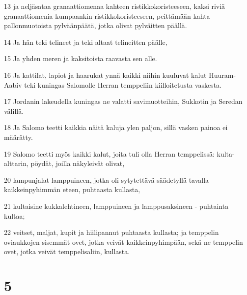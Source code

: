 \par 13 ja neljäsataa granaattiomenaa kahteen ristikkokoristeeseen, kaksi riviä granaattiomenia kumpaankin ristikkokoristeeseen, peittämään kahta pallonmuotoista pylväänpäätä, jotka olivat pylväitten päällä.
\par 14 Ja hän teki telineet ja teki altaat telineitten päälle,
\par 15 Ja yhden meren ja kaksitoista raavasta sen alle.
\par 16 Ja kattilat, lapiot ja haarukat ynnä kaikki niihin kuuluvat kalut Huuram-Aabiv teki kuningas Salomolle Herran temppeliin kiilloitetusta vaskesta.
\par 17 Jordanin lakeudella kuningas ne valatti savimuotteihin, Sukkotin ja Seredan välillä.
\par 18 Ja Salomo teetti kaikkia näitä kaluja ylen paljon, sillä vasken painoa ei määrätty.
\par 19 Salomo teetti myös kaikki kalut, joita tuli olla Herran temppelissä: kulta-alttarin, pöydät, joilla näkyleivät olivat,
\par 20 lampunjalat lamppuineen, jotka oli sytytettävä säädetyllä tavalla kaikkeinpyhimmän eteen, puhtaasta kullasta,
\par 21 kultaisine kukkalehtineen, lamppuineen ja lamppusaksineen - puhtainta kultaa;
\par 22 veitset, maljat, kupit ja hiilipannut puhtaasta kullasta; ja temppelin oviaukkojen sisemmät ovet, jotka veivät kaikkeinpyhimpään, sekä ne temppelin ovet, jotka veivät temppelisaliin, kullasta.

\chapter{5}

